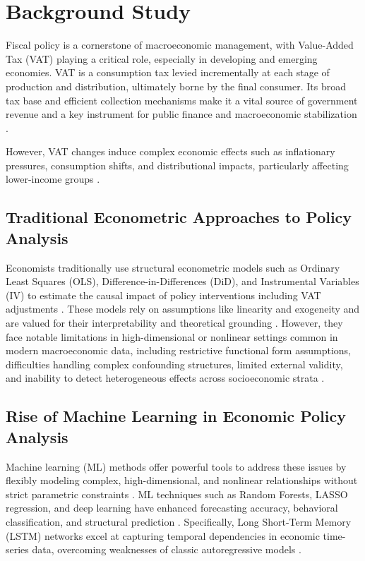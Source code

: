 \section{Background Study}\label{sec:background}
Fiscal policy is a cornerstone of macroeconomic management, with Value-Added Tax (VAT) playing a critical role, especially in developing and emerging economies. VAT is a consumption tax levied incrementally at each stage of production and distribution, ultimately borne by the final consumer. Its broad tax base and efficient collection mechanisms make it a vital source of government revenue and a key instrument for public finance and macroeconomic stabilization \citep[see section 1.1]{main}.

However, VAT changes induce complex economic effects such as inflationary pressures, consumption shifts, and distributional impacts, particularly affecting lower-income groups \citep[section 1.1]{main}.

\subsection*{Traditional Econometric Approaches to Policy Analysis}
Economists traditionally use structural econometric models such as Ordinary Least Squares (OLS), Difference-in-Differences (DiD), and Instrumental Variables (IV) to estimate the causal impact of policy interventions including VAT adjustments \citep[section 2.1]{main}. These models rely on assumptions like linearity and exogeneity and are valued for their interpretability and theoretical grounding \citep{heckman2008, heckman2023}. However, they face notable limitations in high-dimensional or nonlinear settings common in modern macroeconomic data, including restrictive functional form assumptions, difficulties handling complex confounding structures, limited external validity, and inability to detect heterogeneous effects across socioeconomic strata \citep[section 2.2]{main}.

\subsection*{Rise of Machine Learning in Economic Policy Analysis}
Machine learning (ML) methods offer powerful tools to address these issues by flexibly modeling complex, high-dimensional, and nonlinear relationships without strict parametric constraints \citep[section 2.3]{main}. ML techniques such as Random Forests, LASSO regression, and deep learning have enhanced forecasting accuracy, behavioral classification, and structural prediction \citep{bankofcanada2023, sekhansen2023}. Specifically, Long Short-Term Memory (LSTM) networks excel at capturing temporal dependencies in economic time-series data, overcoming weaknesses of classic autoregressive models \citep[sec. 4.3.1]{main}.

